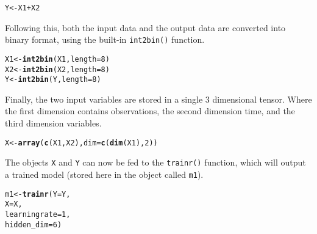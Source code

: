 \documentclass[english,article]{article}\usepackage[]{graphicx}\usepackage[]{color}
\makeatletter
\newcommand{\hlnum}[1]{\textcolor[rgb]{0.686,0.059,0.569}{#1}}%
\newcommand{\hlopt}[1]{\textcolor[rgb]{0,0,0}{#1}}%
\newcommand{\hlstd}[1]{\textcolor[rgb]{0.345,0.345,0.345}{#1}}%
\newcommand{\hlkwb}[1]{\textcolor[rgb]{0.69,0.353,0.396}{#1}}%
\newcommand{\hlkwc}[1]{\textcolor[rgb]{0.333,0.667,0.333}{#1}}%
\newcommand{\hlkwd}[1]{\textcolor[rgb]{0.737,0.353,0.396}{\textbf{#1}}}%
\newenvironment{kframe}{%
 \def\at@end@of@kframe{}%
 \ifinner\ifhmode%
  \def\at@end@of@kframe{\end{minipage}}%
  \begin{minipage}{\columnwidth}%
 \fi\fi%
 \def\FrameCommand##1{\hskip\@totalleftmargin \hskip-\fboxsep
 \colorbox{shadecolor}{##1}\hskip-\fboxsep
     \hskip-\linewidth \hskip-\@totalleftmargin \hskip\columnwidth}%
 \MakeFramed {\advance\hsize-\width
   \@totalleftmargin\z@ \linewidth\hsize
   \@setminipage}}%
 {\par\unskip\endMakeFramed%
 \at@end@of@kframe}
\newenvironment{knitrout}{}{} %
\providecommand*{\code}[1]{\texttt{#1}}
\makeatother
\begin{document}
\begin{knitrout}
\color{fgcolor}\begin{kframe}
\begin{alltt}
\hlstd{Y} \hlkwb{<-} \hlstd{X1} \hlopt{+} \hlstd{X2}
\end{alltt}
\end{kframe}
\end{knitrout}

Following this, both the input data and the output data are converted
into binary format, using the built-in \code{int2bin()} function.

\begin{knitrout}
\color{fgcolor}\begin{kframe}
\begin{alltt}
\hlstd{X1} \hlkwb{<-} \hlkwd{int2bin}\hlstd{(X1,} \hlkwc{length}\hlstd{=}\hlnum{8}\hlstd{)}
\hlstd{X2} \hlkwb{<-} \hlkwd{int2bin}\hlstd{(X2,} \hlkwc{length}\hlstd{=}\hlnum{8}\hlstd{)}
\hlstd{Y}  \hlkwb{<-} \hlkwd{int2bin}\hlstd{(Y,}  \hlkwc{length}\hlstd{=}\hlnum{8}\hlstd{)}
\end{alltt}
\end{kframe}
\end{knitrout}

Finally, the two input variables are stored in a single 3 dimensional
tensor. Where the first dimension contains observations, the second
dimension time, and the third dimension variables.

\begin{knitrout}
\color{fgcolor}\begin{kframe}
\begin{alltt}
\hlstd{X} \hlkwb{<-} \hlkwd{array}\hlstd{(} \hlkwd{c}\hlstd{(X1,X2),} \hlkwc{dim}\hlstd{=}\hlkwd{c}\hlstd{(}\hlkwd{dim}\hlstd{(X1),}\hlnum{2}\hlstd{) )}
\end{alltt}
\end{kframe}
\end{knitrout}

The objects \code{X} and \code{Y} can now be fed to the \code{trainr()}
function, which will output a trained model (stored here in the object
called \code{m1}).

\begin{knitrout}
\color{fgcolor}\begin{kframe}
\begin{alltt}
\hlstd{m1} \hlkwb{<-} \hlkwd{trainr}\hlstd{(}\hlkwc{Y}\hlstd{=Y,}
             \hlkwc{X}\hlstd{=X,}
             \hlkwc{learningrate}   \hlstd{=} \hlnum{1}\hlstd{,}
             \hlkwc{hidden_dim}     \hlstd{=} \hlnum{6}   \hlstd{)}
\end{alltt}


{\ttfamily\noindent\itshape\color{messagecolor}{\#\# Trained epoch: 1 - Learning rate: 1}}

{\ttfamily\noindent\itshape\color{messagecolor}{\#\# Epoch error: 0.194449702806897}}\end{kframe}
\end{knitrout}
\end{document}
